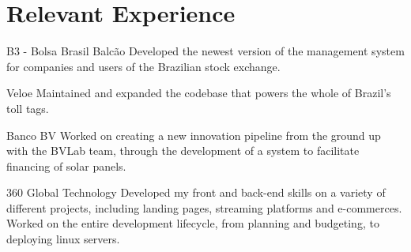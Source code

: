 \section{Relevant Experience}

\begin{experience}{B3 - Bolsa Brasil Balcão}{
}
Developed the newest version of the management system for companies and users of the Brazilian stock exchange.

\end{experience}
\begin{experience}{Veloe}{
}
Maintained and expanded the codebase that powers the whole of Brazil's toll tags.

\end{experience}
\begin{experience}{Banco BV}{
}
Worked on creating a new innovation pipeline from the ground up with the BVLab team, through the development of a system to facilitate financing of solar panels.

\end{experience}
\begin{experience}[last]{360 Global Technology}{
}
Developed my front and back-end skills on a variety of different projects, including landing pages, streaming platforms and e-commerces. Worked on the entire development lifecycle, from planning and budgeting, to deploying linux servers.

\end{experience}
